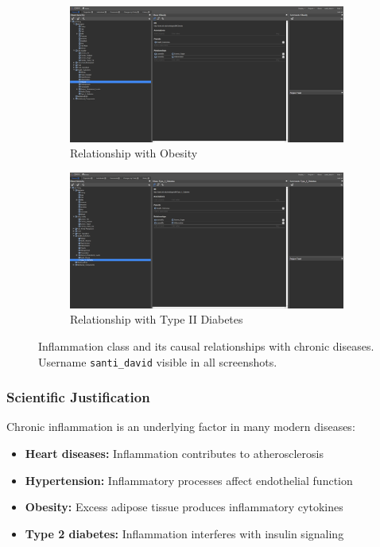 \documentclass[12pt,a4paper]{article}
\begin{document}
\begin{figure}[H]
    \begin{subfigure}[b]{0.45\textwidth}
        \includegraphics[width=\textwidth]{screenshots/inflammation_3.png}
        \caption{Relationship with Obesity}
    \end{subfigure}
    \hfill
    \begin{subfigure}[b]{0.45\textwidth}
        \includegraphics[width=\textwidth]{screenshots/inflammation_4.png}
        \caption{Relationship with Type II Diabetes}
    \end{subfigure}
    
    \caption{Inflammation class and its causal relationships with chronic diseases. Username \texttt{santi\_david} visible in all screenshots.}
    \label{fig:inflammation_relations}
\end{figure}

\subsubsection{Scientific Justification}

Chronic inflammation is an underlying factor in many modern diseases:

\begin{itemize}
    \item \textbf{Heart diseases:} Inflammation contributes to atherosclerosis
    \item \textbf{Hypertension:} Inflammatory processes affect endothelial function
    \item \textbf{Obesity:} Excess adipose tissue produces inflammatory cytokines
    \item \textbf{Type 2 diabetes:} Inflammation interferes with insulin signaling
\end{itemize}
\end{document}
